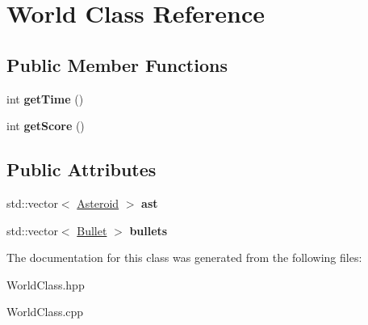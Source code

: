 \hypertarget{class_world}{}\section{World Class Reference}
\label{class_world}
\subsection*{Public Member Functions}
\begin{DoxyCompactItemize}
\item 
\mbox{\label{class_world_a1ff572b326400260c264629e2ecd3599}} 
int {\bfseries get\+Time} ()
\item 
\mbox{\label{class_world_afcef3e1be78f3497b8208b8e73b304d7}} 
int {\bfseries get\+Score} ()
\end{DoxyCompactItemize}
\subsection*{Public Attributes}
\begin{DoxyCompactItemize}
\item 
\mbox{\label{class_world_a4ff9ca7020b2b1e7dd433ed6a9080003}} 
std\+::vector$<$ \hyperlink{class_asteroid}{Asteroid} $>$ {\bfseries ast}
\item 
\mbox{\label{class_world_aa1a7c1687de0e000b5f6ea09f255c861}} 
std\+::vector$<$ \hyperlink{class_bullet}{Bullet} $>$ {\bfseries bullets}
\end{DoxyCompactItemize}


The documentation for this class was generated from the following files\+:\begin{DoxyCompactItemize}
\item 
World\+Class.\+hpp\item 
World\+Class.\+cpp\end{DoxyCompactItemize}
